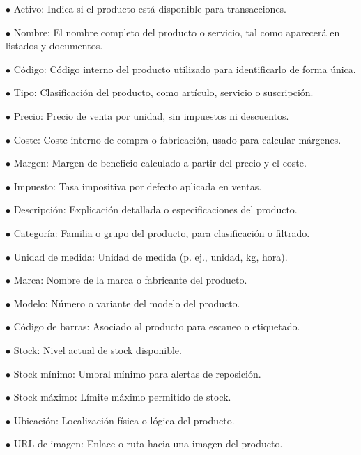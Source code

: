 \documentclass[a4paper]{article}
\begin{document}
\begin{compactitem}
\item[\color{myblue}$\bullet$] Activo: Indica si el producto está disponible para transacciones.
\item[\color{myblue}$\bullet$] Nombre: El nombre completo del producto o servicio, tal como aparecerá en listados y documentos.
\item[\color{myblue}$\bullet$] Código: Código interno del producto utilizado para identificarlo de forma única.
\item[\color{myblue}$\bullet$] Tipo: Clasificación del producto, como artículo, servicio o suscripción.
\item[\color{myblue}$\bullet$] Precio: Precio de venta por unidad, sin impuestos ni descuentos.
\item[\color{myblue}$\bullet$] Coste: Coste interno de compra o fabricación, usado para calcular márgenes.
\item[\color{myblue}$\bullet$] Margen: Margen de beneficio calculado a partir del precio y el coste.
\item[\color{myblue}$\bullet$] Impuesto: Tasa impositiva por defecto aplicada en ventas.
\item[\color{myblue}$\bullet$] Descripción: Explicación detallada o especificaciones del producto.
\item[\color{myblue}$\bullet$] Categoría: Familia o grupo del producto, para clasificación o filtrado.
\item[\color{myblue}$\bullet$] Unidad de medida: Unidad de medida (p. ej., unidad, kg, hora).
\item[\color{myblue}$\bullet$] Marca: Nombre de la marca o fabricante del producto.
\item[\color{myblue}$\bullet$] Modelo: Número o variante del modelo del producto.
\item[\color{myblue}$\bullet$] Código de barras: Asociado al producto para escaneo o etiquetado.
\item[\color{myblue}$\bullet$] Stock: Nivel actual de stock disponible.
\item[\color{myblue}$\bullet$] Stock mínimo: Umbral mínimo para alertas de reposición.
\item[\color{myblue}$\bullet$] Stock máximo: Límite máximo permitido de stock.
\item[\color{myblue}$\bullet$] Ubicación: Localización física o lógica del producto.
\item[\color{myblue}$\bullet$] URL de imagen: Enlace o ruta hacia una imagen del producto.
\end{compactitem}
\end{document}
